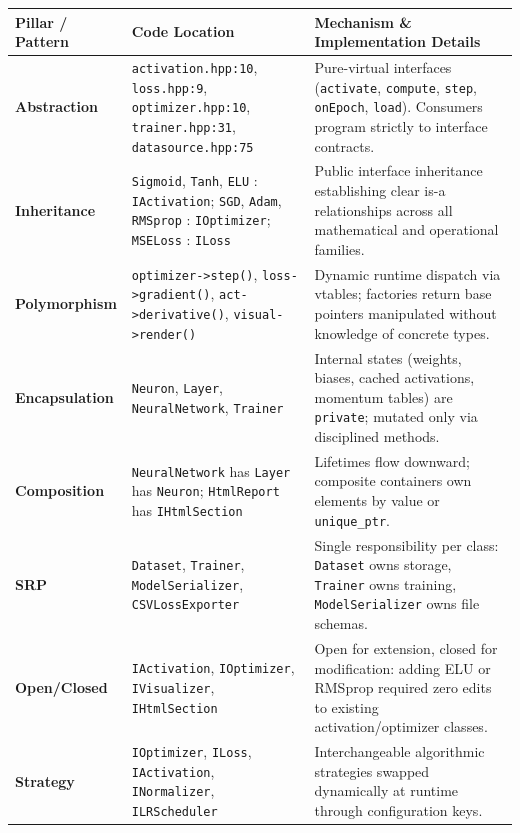 \documentclass[11pt,a4paper]{article}
\begin{document}
\begin{table}[htbp]
\scriptsize
\centering
\begin{tabularx}{\textwidth}{l p{4.5cm} X}
\toprule
\textbf{Pillar / Pattern} & \textbf{Code Location} & \textbf{Mechanism \& Implementation Details} \\
\midrule
\textbf{Abstraction} & \texttt{activation.hpp:10}, \texttt{loss.hpp:9}, \texttt{optimizer.hpp:10}, \texttt{trainer.hpp:31}, \texttt{datasource.hpp:75} & Pure-virtual interfaces (\texttt{activate}, \texttt{compute}, \texttt{step}, \texttt{onEpoch}, \texttt{load}). Consumers program strictly to interface contracts. \\
\addlinespace
\textbf{Inheritance} & \texttt{Sigmoid}, \texttt{Tanh}, \texttt{ELU} : \texttt{IActivation}; \texttt{SGD}, \texttt{Adam}, \texttt{RMSprop} : \texttt{IOptimizer}; \texttt{MSELoss} : \texttt{ILoss} & Public interface inheritance establishing clear is-a relationships across all mathematical and operational families. \\
\addlinespace
\textbf{Polymorphism} & \texttt{optimizer->step()}, \texttt{loss->gradient()}, \texttt{act->derivative()}, \texttt{visual->render()} & Dynamic runtime dispatch via vtables; factories return base pointers manipulated without knowledge of concrete types. \\
\addlinespace
\textbf{Encapsulation} & \texttt{Neuron}, \texttt{Layer}, \texttt{NeuralNetwork}, \texttt{Trainer} & Internal states (weights, biases, cached activations, momentum tables) are \texttt{private}; mutated only via disciplined methods. \\
\addlinespace
\textbf{Composition} & \texttt{NeuralNetwork} has \texttt{Layer} has \texttt{Neuron}; \texttt{HtmlReport} has \texttt{IHtmlSection} & Lifetimes flow downward; composite containers own elements by value or \texttt{unique\_ptr}. \\
\addlinespace
\textbf{SRP} & \texttt{Dataset}, \texttt{Trainer}, \texttt{ModelSerializer}, \texttt{CSVLossExporter} & Single responsibility per class: \texttt{Dataset} owns storage, \texttt{Trainer} owns training, \texttt{ModelSerializer} owns file schemas. \\
\addlinespace
\textbf{Open/Closed} & \texttt{IActivation}, \texttt{IOptimizer}, \texttt{IVisualizer}, \texttt{IHtmlSection} & Open for extension, closed for modification: adding ELU or RMSprop required zero edits to existing activation/optimizer classes. \\
\addlinespace
\textbf{Strategy} & \texttt{IOptimizer}, \texttt{ILoss}, \texttt{IActivation}, \texttt{INormalizer}, \texttt{ILRScheduler} & Interchangeable algorithmic strategies swapped dynamically at runtime through configuration keys. \\

\end{tabularx}
\end{table}
\end{document}
